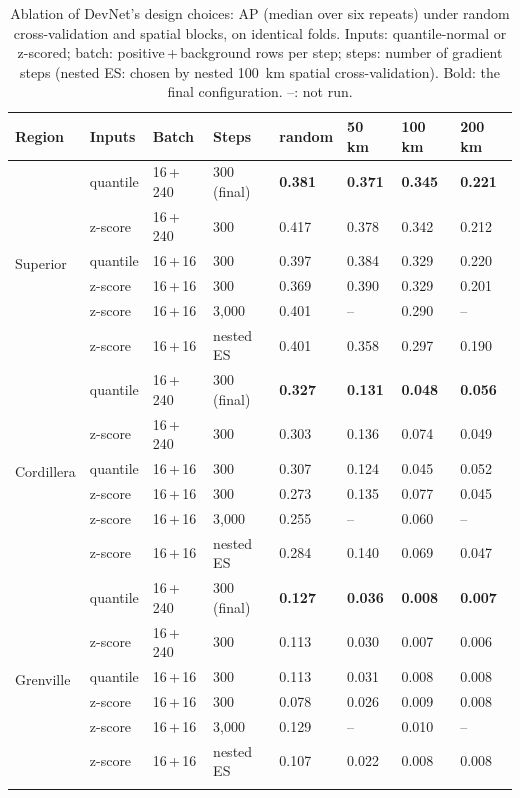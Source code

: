 \documentclass[pdflatex,sn-apa]{sn-jnl}
\begin{document}
\begin{appendices}
\begin{table}[!h]
\caption{Ablation of DevNet's design choices: AP (median over six repeats) under random cross-validation and spatial blocks, on identical folds. Inputs: quantile-normal or z-scored; batch: positive\,+\,background rows per step; steps: number of gradient steps (nested ES: chosen by nested 100~km spatial cross-validation). Bold: the final configuration. --: not run.}\label{tab:ablation}
\scriptsize
\setlength{\tabcolsep}{2.5pt}
\begin{tabular*}{\textwidth}{@{\extracolsep\fill}llllllll}
\toprule
Region & Inputs & Batch & Steps & random & 50 km & 100 km & 200 km \\
\midrule
\multirow{6}{*}{Superior} & quantile & 16\,+\,240 & 300 (final) & \textbf{0.381} & \textbf{0.371} & \textbf{0.345} & \textbf{0.221} \\
 & z-score & 16\,+\,240 & 300 & 0.417 & 0.378 & 0.342 & 0.212 \\
 & quantile & 16\,+\,16 & 300 & 0.397 & 0.384 & 0.329 & 0.220 \\
 & z-score & 16\,+\,16 & 300 & 0.369 & 0.390 & 0.329 & 0.201 \\
 & z-score & 16\,+\,16 & 3,000 & 0.401 & -- & 0.290 & -- \\
 & z-score & 16\,+\,16 & nested ES & 0.401 & 0.358 & 0.297 & 0.190 \\
\midrule
\multirow{6}{*}{Cordillera} & quantile & 16\,+\,240 & 300 (final) & \textbf{0.327} & \textbf{0.131} & \textbf{0.048} & \textbf{0.056} \\
 & z-score & 16\,+\,240 & 300 & 0.303 & 0.136 & 0.074 & 0.049 \\
 & quantile & 16\,+\,16 & 300 & 0.307 & 0.124 & 0.045 & 0.052 \\
 & z-score & 16\,+\,16 & 300 & 0.273 & 0.135 & 0.077 & 0.045 \\
 & z-score & 16\,+\,16 & 3,000 & 0.255 & -- & 0.060 & -- \\
 & z-score & 16\,+\,16 & nested ES & 0.284 & 0.140 & 0.069 & 0.047 \\
\midrule
\multirow{6}{*}{Grenville} & quantile & 16\,+\,240 & 300 (final) & \textbf{0.127} & \textbf{0.036} & \textbf{0.008} & \textbf{0.007} \\
 & z-score & 16\,+\,240 & 300 & 0.113 & 0.030 & 0.007 & 0.006 \\
 & quantile & 16\,+\,16 & 300 & 0.113 & 0.031 & 0.008 & 0.008 \\
 & z-score & 16\,+\,16 & 300 & 0.078 & 0.026 & 0.009 & 0.008 \\
 & z-score & 16\,+\,16 & 3,000 & 0.129 & -- & 0.010 & -- \\
 & z-score & 16\,+\,16 & nested ES & 0.107 & 0.022 & 0.008 & 0.008 \\
\botrule
\end{tabular*}
\end{table}


\end{appendices}
\end{document}
